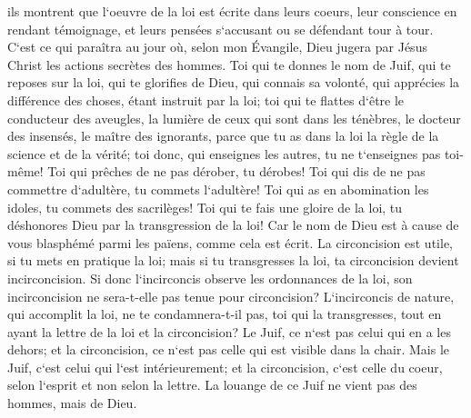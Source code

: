\verse ils montrent que l`oeuvre de la loi est écrite dans leurs coeurs, leur conscience en rendant témoignage, et leurs pensées s`accusant ou se défendant tour à tour. 
\verse C`est ce qui paraîtra au jour où, selon mon Évangile, Dieu jugera par Jésus Christ les actions secrètes des hommes. 
\verse Toi qui te donnes le nom de Juif, qui te reposes sur la loi, qui te glorifies de Dieu, 
\verse qui connais sa volonté, qui apprécies la différence des choses, étant instruit par la loi; 
\verse toi qui te flattes d`être le conducteur des aveugles, la lumière de ceux qui sont dans les ténèbres, 
\verse le docteur des insensés, le maître des ignorants, parce que tu as dans la loi la règle de la science et de la vérité; 
\verse toi donc, qui enseignes les autres, tu ne t`enseignes pas toi-même! Toi qui prêches de ne pas dérober, tu dérobes! 
\verse Toi qui dis de ne pas commettre d`adultère, tu commets l`adultère! Toi qui as en abomination les idoles, tu commets des sacrilèges! 
\verse Toi qui te fais une gloire de la loi, tu déshonores Dieu par la transgression de la loi! 
\verse Car le nom de Dieu est à cause de vous blasphémé parmi les païens, comme cela est écrit. 
\verse La circoncision est utile, si tu mets en pratique la loi; mais si tu transgresses la loi, ta circoncision devient incirconcision. 
\verse Si donc l`incirconcis observe les ordonnances de la loi, son incirconcision ne sera-t-elle pas tenue pour circoncision? 
\verse L`incirconcis de nature, qui accomplit la loi, ne te condamnera-t-il pas, toi qui la transgresses, tout en ayant la lettre de la loi et la circoncision? 
\verse Le Juif, ce n`est pas celui qui en a les dehors; et la circoncision, ce n`est pas celle qui est visible dans la chair. 
\verse Mais le Juif, c`est celui qui l`est intérieurement; et la circoncision, c`est celle du coeur, selon l`esprit et non selon la lettre. La louange de ce Juif ne vient pas des hommes, mais de Dieu. 

